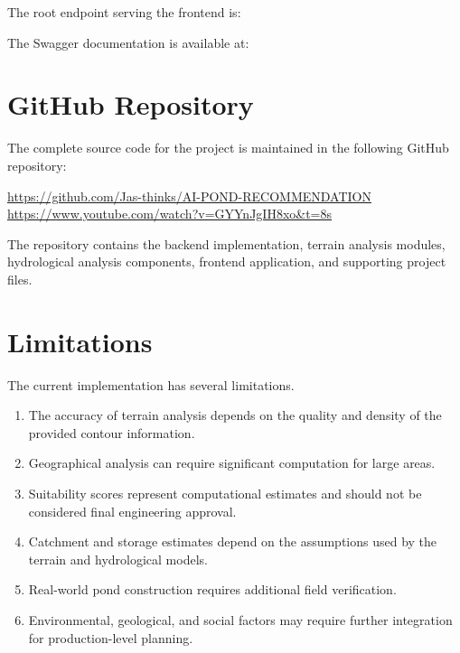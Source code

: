\documentclass[12pt,a4paper]{article}
\begin{document}
The root endpoint serving the frontend is:

\begin{center}
\end{center}

The Swagger documentation is available at:

\begin{center}
\end{center}

\section{GitHub Repository}

The complete source code for the project is maintained in the following GitHub repository:

\begin{center}
\url{https://github.com/Jas-thinks/AI-POND-RECOMMENDATION}\\
\url{https://www.youtube.com/watch?v=GYYnJgIH8xo&t=8s}
\end{center}

The repository contains the backend implementation, terrain analysis modules, hydrological
analysis components, frontend application, and supporting project files.

\section{Limitations}

The current implementation has several limitations.

\begin{enumerate}
    \item The accuracy of terrain analysis depends on the quality and density of the provided contour information.
    \item Geographical analysis can require significant computation for large areas.
    \item Suitability scores represent computational estimates and should not be considered final engineering approval.
    \item Catchment and storage estimates depend on the assumptions used by the terrain and hydrological models.
    \item Real-world pond construction requires additional field verification.
    \item Environmental, geological, and social factors may require further integration for production-level planning.
\end{enumerate}
\end{document}
